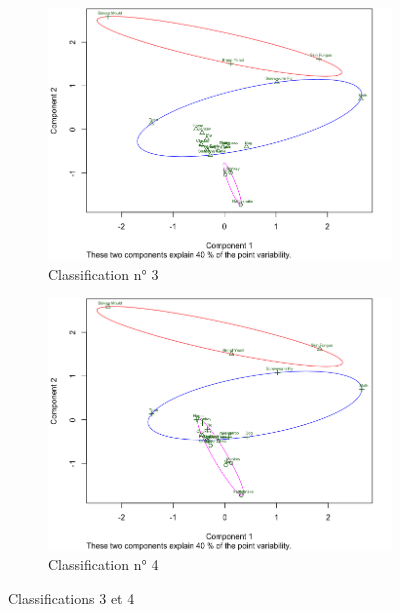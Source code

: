 \documentclass[a4paper,10pt]{report}
\begin{document}
\begin{figure}[H]
	\centering
	\captionsetup{justification=centering, margin=2cm}
	\begin{subfigure}[b]{0.5\linewidth}
		\centering
		\captionsetup{justification=centering}
		\includegraphics[width=1\linewidth]{img/3-3-mut-K-means-class-3}
		\caption{\small Classification n° 3}
		\label{fig:3-3-mut-K-means-class-3}
	\end{subfigure}%
	\begin{subfigure}[b]{0.5\linewidth}
		\centering
		\captionsetup{justification=centering}
		\includegraphics[width=1\linewidth]{img/3-3-mut-K-means-class-4}
		\caption{\small Classification n° 4}
		\label{fig:3-3-mut-K-means-class-4}
	\end{subfigure}%
	\caption{\small Classifications 3 et 4}
\end{figure}
\end{document}
